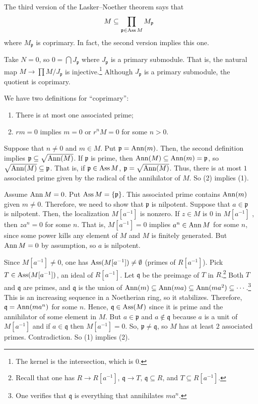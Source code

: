\documentclass [11 pt, oneside] {article}
\begin{document}
The third version of the Lasker--Noether theorem says that
\begin{align*}
	M \subseteq \prod_{\mathfrak{p}\in \operatorname{Ass} M} M_{\mathfrak{p}}
\end{align*}
where $M_{\mathfrak{p}}$ is coprimary. In fact, the second version implies this one. 

Take $N=0$, so $0 = \bigcap J_{\mathfrak{p} }$ where $J_{\mathfrak{p}}$ is a primary submodule. That is, the natural map $M \longrightarrow \prod M/J_{\mathfrak{p}}$ is injective.\footnote{The kernel is the intersection, which is $0$.} Although $J_{\mathfrak{p}}$ is a primary submodule, the quotient is coprimary.

We have two definitions for ``coprimary'':
\begin{enumerate}
	\item There is at most one associated prime;
	\item $rm = 0$ implies $m=0$ or $r^nM=0$ for some $n>0$.
\end{enumerate}

Suppose that $n\ne 0$ and $m\in M$. Put $\mathfrak{p} = \operatorname{Ann}(m)$. Then, the second definition implies $\mathfrak{p} \subseteq \sqrt{\operatorname{Ann} (M)} $. If $\mathfrak{p}$ is prime, then $\operatorname{Ann}(M)\subseteq \operatorname{Ann} (m)= \mathfrak{p}$, so $\sqrt{\operatorname{Ann}(M)}\subseteq \mathfrak{p} $. That is, if $\mathfrak{p}\in \operatorname{Ass} M$, $\mathfrak{p} = \sqrt{\operatorname{Ann} (M)} $. Thus, there is at most $1$ associated prime given by the radical of the annihilator of $M$. So (2) implies (1).

Assume $\operatorname{Ann} M=0$. Put $\operatorname{Ass} M = \{\mathfrak{p}\}$. This associated prime contains $\operatorname{Ann} (m)$ given $m\ne 0$. Therefore, we need to show that $\mathfrak{p}$ is nilpotent. Suppose that $a\in \mathfrak{p}$ is nilpotent. Then, the localization $M[a^{-1}]$ is nonzero. If $z\in M$ is $0$ in $M[a^{-1}]$ , then $za^n=0$ for some $n$. That is, $M[a^{-1}]=0$ implies $a^n \in \operatorname{Ann} M$ for some $n$, since some power kills any element of $M$ and $M$ is finitely generated. But $\operatorname{Ann} M=0$ by assumption, so $a$ is nilpotent. 

Since $M[a^{-1}]\ne 0$, one has $\operatorname{Ass} (M[a^{-1}])\ne \emptyset$ (primes of $R[a^{-1}]$). Pick $T\in \operatorname{Ass} (M[a^{-1}])$, an ideal of $R[a^{-1}]$. Let $\mathfrak{q}$ be the preimage of $T$ in $R$.\footnote{Recall that one has $R\longrightarrow  R[a^{-1}]$, $\mathfrak{q}\longrightarrow T$, $\mathfrak{q}\subseteq R$, and $T\subseteq R[a^{-1}]$.} Both $T$ and $\mathfrak{q}$ are primes, and $\mathfrak{q}$ is the union of $\operatorname{Ann}(m)\subseteq \operatorname{Ann} (ma)\subseteq \operatorname{Ann} (ma^2)\subseteq \cdots$.\footnote{One verifies that $\mathfrak{q}$ is everything that annihilates $ma^n$.} This is an increasing sequence in a Noetherian ring, so it stabilizes. Therefore, $\mathfrak{q}=\operatorname{Ann}(ma^n)$ for some $n$. Hence, $\mathfrak{q}\in \operatorname{Ass}(M)$ since it is prime and the annihilator of some element in $M$. But $a\in \mathfrak{p}$ and $a\notin \mathfrak{q}$ because $a$ is a unit of $M[a^{-1}]$ and if $a\in \mathfrak{q}$ then $M[a^{-1}]=0$. So, $\mathfrak{p}\ne \mathfrak{q}$, so $M$ has at least $2$ associated primes. Contradiction. So (1) implies (2).
\end{document}
